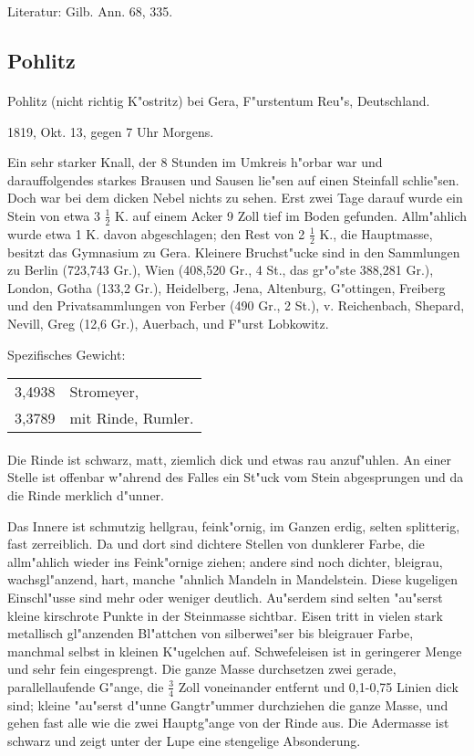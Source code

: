 \documentclass[a4paper, 11pt, oneside]{article}
\begin{document}
\footnotesize
Literatur: Gilb. Ann. 68, 335.
\subsection{Pohlitz}
\normalsize
\paragraph{}
Pohlitz (nicht richtig K"ostritz) bei Gera, F"urstentum Reu"s, Deutschland.

1819, Okt. 13, gegen 7 Uhr Morgens.

Ein sehr starker Knall, der 8 Stunden im Umkreis h"orbar war und darauffolgendes starkes Brausen und Sausen lie"sen auf einen Steinfall schlie"sen. Doch war bei dem dicken Nebel nichts zu sehen. Erst zwei Tage darauf wurde ein Stein von etwa 3 $\frac{1}{2}$ K. auf einem Acker 9 Zoll tief im Boden gefunden. Allm"ahlich wurde etwa 1 K. davon abgeschlagen; den Rest von 2 $\frac{1}{2}$ K., die Hauptmasse, besitzt das Gymnasium zu Gera. Kleinere Bruchst"ucke sind in den Sammlungen zu Berlin (723,743 Gr.), Wien (408,520 Gr., 4 St., das gr"o"ste 388,281 Gr.), London, Gotha (133,2 Gr.), Heidelberg, Jena, Altenburg, G"ottingen, Freiberg und den Privatsammlungen von Ferber (490 Gr., 2 St.), v. Reichenbach, Shepard, Nevill, Greg (12,6 Gr.), Auerbach, und F"urst Lobkowitz.

Spezifisches Gewicht:
\begin{table}[!ht]
    \centering
    \begin{tabular}{l l}
        3,4938 & Stromeyer,\\
        3,3789 & mit Rinde, Rumler.
    \end{tabular}
\end{table}
\paragraph{}
Die Rinde ist schwarz, matt, ziemlich dick und etwas rau anzuf"uhlen. An einer Stelle ist offenbar w"ahrend des Falles ein St"uck vom Stein abgesprungen und da die Rinde merklich d"unner.

Das Innere ist schmutzig hellgrau, feink"ornig, im Ganzen erdig, selten splitterig, fast zerreiblich. Da und dort sind dichtere Stellen von dunklerer Farbe, die allm"ahlich wieder ins Feink"ornige ziehen; andere sind noch dichter, bleigrau, wachsgl"anzend, hart, manche "ahnlich Mandeln in Mandelstein. Diese kugeligen Einschl"usse sind mehr oder weniger deutlich. Au"serdem sind selten "au"serst kleine kirschrote Punkte in der Steinmasse sichtbar. Eisen tritt in vielen stark metallisch gl"anzenden Bl"attchen von silberwei"ser bis bleigrauer Farbe, manchmal selbst in kleinen K"ugelchen auf. Schwefeleisen ist in geringerer Menge und sehr fein eingesprengt. Die ganze Masse durchsetzen zwei gerade, parallellaufende G"ange, die $\frac{3}{4}$ Zoll voneinander entfernt und 0,1-0,75 Linien dick sind; kleine "au"serst d"unne Gangtr"ummer durchziehen die ganze Masse, und gehen fast alle wie die zwei Hauptg"ange von der Rinde aus. Die Adermasse ist schwarz und zeigt unter der Lupe eine stengelige Absonderung.
\end{document}
